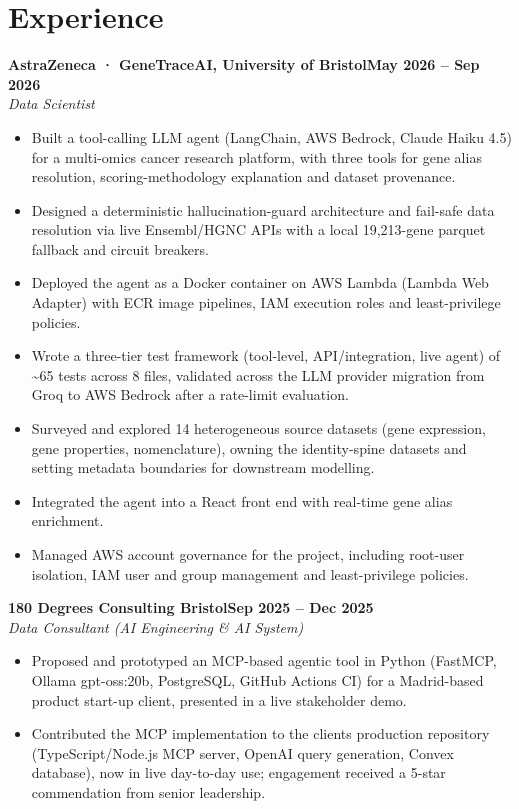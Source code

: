 \documentclass[a4paper,11pt]{article}
\newcommand{\entry}[4]{\needspace{4\baselineskip}\noindent\textbf{#1}\hfill\textbf{#2}\\ \textit{#3}\hfill\textit{#4}\par}
\begin{document}
\section{Experience}
\entry{AstraZeneca · GeneTraceAI, University of Bristol}{May 2026 – Sep 2026}{Data Scientist}{}
\begin{itemize}
  \item Built a tool-calling LLM agent (LangChain, AWS Bedrock, Claude Haiku 4.5) for a multi-omics cancer research platform, with three tools for gene alias resolution, scoring-methodology explanation and dataset provenance.
  \item Designed a deterministic hallucination-guard architecture and fail-safe data resolution via live Ensembl/HGNC APIs with a local 19,213-gene parquet fallback and circuit breakers.
  \item Deployed the agent as a Docker container on AWS Lambda (Lambda Web Adapter) with ECR image pipelines, IAM execution roles and least-privilege policies.
  \item Wrote a three-tier test framework (tool-level, API/integration, live agent) of \textasciitilde{}65 tests across 8 files, validated across the LLM provider migration from Groq to AWS Bedrock after a rate-limit evaluation.
  \item Surveyed and explored 14 heterogeneous source datasets (gene expression, gene properties, nomenclature), owning the identity-spine datasets and setting metadata boundaries for downstream modelling.
  \item Integrated the agent into a React front end with real-time gene alias enrichment.
  \item Managed AWS account governance for the project, including root-user isolation, IAM user and group management and least-privilege policies.
\end{itemize}
\vspace{4pt}
\entry{180 Degrees Consulting Bristol}{Sep 2025 – Dec 2025}{Data Consultant (AI Engineering \& AI System)}{}
\begin{itemize}
  \item Proposed and prototyped an MCP-based agentic tool in Python (FastMCP, Ollama gpt-oss:20b, PostgreSQL, GitHub Actions CI) for a Madrid-based product start-up client, presented in a live stakeholder demo.
  \item Contributed the MCP implementation to the client\textquotesingle{}s production repository (TypeScript/Node.js MCP server, OpenAI query generation, Convex database), now in live day-to-day use; engagement received a 5-star commendation from senior leadership.
\end{itemize}
\end{document}
